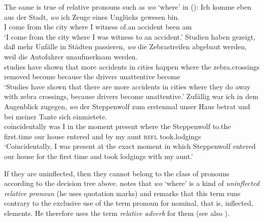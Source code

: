 The same is true of relative pronouns such as \emph{wo} `where' in ():
\eal
\ex 
\gll Ich komme eben aus der Stadt, \emph{wo} ich Zeuge eines Unglücks gewesen bin.\footnotemark\\
	 I come \particle{} from the city where I witness of.an accident been am\\
\label{bsp-wo-ich-zeuge}
\glt `I come from the city where I was witness to an accident.' 
\ex 
\gll Studien haben gezeigt, daß mehr Unfälle in Städten passieren, \emph{wo} die Zebrastreifen abgebaut werden, weil die Autofahrer unaufmerksam werden.\footnotemark\\
     studies have shown that more accidents in cities happen where the zebra.crossings removed become because the drivers unattentive become\\
\glt `Studies have shown that there are more accidents in cities where they do away with zebra crossings, because drivers become unattentive.'
\ex 
\gll Zufällig war ich in dem Augenblick zugegen, \emph{wo} der Steppenwolf zum erstenmal unser Haus betrat und bei meiner Tante sich einmietete.\footnotemark\\
	 coincidentally was I in the moment present where the Steppenwolf to.the first.time our house entered and by my aunt \textsc{refl} took.lodgings\\

\glt `Coincidentally, I was present at the exact moment in which Steppenwolf entered our house for the first time and took lodgings with my aunt.'
\zl


If they are uninflected, then they cannot belong to the class of pronouns according to the decision tree above.
\citet[]{Eisenberg2004a} notes that \emph{wo} `where' is a kind of \emph{uninflected relative
pronoun} (he uses quotation marks) and remarks that this term runs contrary to the exclusive use of the
term pronoun for nominal, that is, inflected, elements. He therefore uses the
term \emph{relative adverb} for them (see also ).

